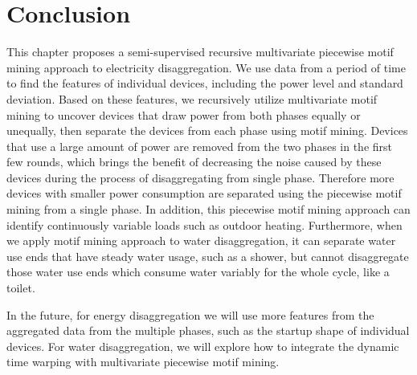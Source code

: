 \section{Conclusion}
This chapter proposes a semi-supervised recursive multivariate piecewise motif mining approach 
to electricity disaggregation. 
We use data from a period of time to find the features of individual devices, 
including the power level and standard deviation.
Based on these features, 
we recursively utilize multivariate motif mining to uncover devices 
that draw power from both phases equally or unequally, 
then separate the devices from each phase using motif mining. 
Devices that use a large amount of power are removed from the two phases in the first few rounds, 
which brings the benefit of decreasing the noise caused by these devices 
during the process of disaggregating from single phase. 
Therefore more devices with smaller power consumption are separated 
using the piecewise motif mining from a single phase. 
In addition, this piecewise motif mining approach can identify
continuously variable loads such as outdoor heating. 
Furthermore, when we apply motif mining approach to water disaggregation, 
it can separate water use ends that have steady water usage, such as a shower, 
but cannot disaggregate those water use ends which consume water variably for the whole 
cycle, like a toilet. 

In the future, 
for energy disaggregation we will use more features from the aggregated data from the multiple phases, 
such as the startup shape of individual devices.
For water disaggregation, we will explore how to integrate the 
dynamic time warping with multivariate piecewise motif mining. 
